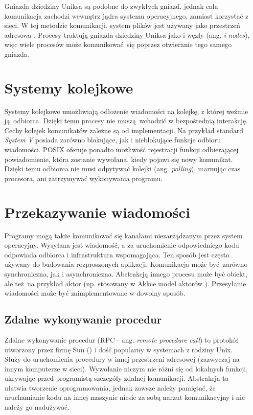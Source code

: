 Gniazda dziedziny Uniksa są podobne do zwykłych gniazd, jednak cała komunikacja zachodzi wewnątrz jądra systemu operacyjnego, zamiast korzystać z sieci. W tej metodzie komunikacji, system plików jest używany jako przestrzeń adresowa \cite{unix_sock}. Procesy traktują gniazda dziedziny Uniksa jako i-węzły (ang. \textit{i-nodes}), więc wiele procesów może komunikować się poprzez otwieranie tego samego gniazda.


\section{Systemy kolejkowe}

Systemy kolejkowe umożliwiają odłożenie wiadomości na kolejkę, z której weźmie ją odbiorca. Dzięki temu procesy nie muszą wchodzić w bezpośrednią interakcję. Cechy kolejek komunikatów zależne są od implementacji. Na przykład standard \textit{System V} posiada zarówno blokujące, jak i nieblokujące funkcje odbioru wiadomości. POSIX oferuje ponadto możliwość rejestracji funkcji odbierającej powiadomienie, która zostanie wywołana, kiedy pojawi się nowy komunikat. Dzięki temu odbiorca nie musi odpytywać kolejki (ang. \textit{polling}), marnując czas procesora, ani zatrzymywać wykonywania programu.


\section{Przekazywanie wiadomości}

Programy mogą także komunikować się kanałami niezarządzanym przez system operacyjny. Wysyłana jest wiadomość, a za uruchomienie odpowiedniego kodu odpowiada odbiorca i infrastruktura wspomagająca. Ten sposób jest często używany do budowania rozproszonych aplikacji. Komunikacja może być zarówno synchroniczna, jak i asynchroniczna. Abstrakcją innego procesu może być obiekt, ale też na przykład aktor (np. stosowany w Akkce model aktorów \cite{akka}). Przesyłanie wiadomości może być zaimplementowane w dowolny sposób.


\subsection{Zdalne wykonywanie procedur}

Zdalne wykonywanie procedur (RPC - ang. \textit{remote procedure call}) to protokół utworzony przez firmę Sun (\cite{rpc}) i dość popularny w systemach z rodziny Unix. Służy do uruchomienia procedury w innej przestrzeni adresowej (zazwyczaj na innym komputerze w sieci). Wywołanie niczym nie różni się od lokalnych funkcji, ukrywając przed programistą szczegóły zdalnej komunikacji. Abstrakcja ta ułatwia tworzenie oprogramowania, jednak zawsze należy pamiętać, że uruchamianie kodu na innej maszynie niesie za sobą narzut komunikacyjny i nie należy go nadużywać.


